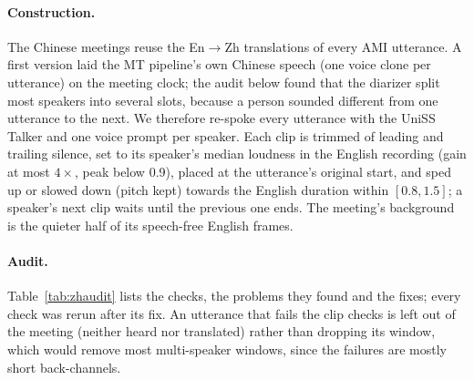 \paragraph{Construction.} The Chinese meetings reuse the En$\rightarrow$Zh translations of every AMI utterance. A first
version laid the MT pipeline's own Chinese speech (one voice clone per utterance) on the meeting clock; the audit below
found that the diarizer split most speakers into several slots, because a person sounded different from one utterance
to the next. We therefore re-spoke every utterance with the UniSS Talker and one voice prompt per speaker. Each clip is
trimmed of leading and trailing silence, set to its speaker's median loudness in the English recording (gain at most
$4\times$, peak below 0.9), placed at the utterance's original start, and sped up or slowed down (pitch kept) towards the
English duration within $[0.8, 1.5]$; a speaker's next clip waits until the previous one ends. The meeting's background
is the quieter half of its speech-free English frames.

\paragraph{Audit.} Table~\ref{tab:zhaudit} lists the checks, the problems they found and the fixes; every check was rerun
after its fix. An utterance that fails the clip checks is left out of the meeting (neither heard nor translated) rather
than dropping its window, which would remove most multi-speaker windows, since the failures are mostly short
back-channels.

\begin{table}[h]
\centering\small
\setlength{\tabcolsep}{3pt}
\caption{Audit of the Chinese AMI meetings. Left out in the end: 19{,}081 of 123{,}353 utterances (CER 13{,}681; no
translation 5{,}295; long pauses 98; other 7).}
\label{tab:zhaudit}
\end{table}

